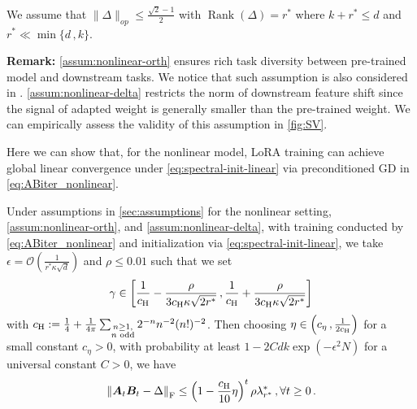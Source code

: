 \begin{assumption}\label{assum:nonlinear-delta}
We assume that $\|\Delta\|_{op}\leq \frac{\sqrt{2}-1}{2}$ with $\operatorname{Rank}(\Delta)=r^*$ where $k+r^*\leq d$ and $r^* \ll \min\{d\,,k\}$.
\end{assumption}

\noindent
{\bf Remark:} 
\cref{assum:nonlinear-orth} ensures rich task diversity between pre-trained model and downstream tasks. We notice that such assumption is also considered in \cite{dayi2024gradientdynamicslowrankfinetuning}.  \cref{assum:nonlinear-delta} restricts the norm of downstream feature shift since the signal of adapted weight is generally smaller than the pre-trained weight. We can empirically assess the validity of this assumption in \cref{fig:SV}.


Here we can show that, for the nonlinear model, LoRA training can achieve global linear convergence under \eqref{eq:spectral-init-linear} via preconditioned GD in \cref{eq:ABiter_nonlinear}.
\begin{theorem}\label{main:LC}
    Under assumptions in \cref{sec:assumptions} for the nonlinear setting, \cref{assum:nonlinear-orth}, and \ref{assum:nonlinear-delta}, with training conducted by \cref{eq:ABiter_nonlinear} and initialization via \eqref{eq:spectral-init-linear},  we take $\epsilon = \mathcal{O}\left(\frac{1}{r^*\kappa\sqrt{d}}\right)$ and $\rho\leq 0.01$ such that
    we set
    \begin{align}\label{main:selection-scale}
        \gamma\in\left[\frac{1}{c_{\rm H}}-\frac{\rho}{3c_{\rm H}\kappa\sqrt{2r^*}}\,,\frac{1}{c_{\rm H}}+\frac{\rho}{3c_{\rm H}\kappa\sqrt{2r^*}}\right]
    \end{align}
    with $c_{\rm H} :=\frac{1}{4} + \frac{1}{4\pi}\sum_{\substack{n\geq 1, \\ n \text{ odd}}} 2^{-n} n^{-2} (n!)^{-2}$.
    Then choosing $\eta \in \left(c_{\eta}\,,\frac{1}{2c_{\rm H}}\right)$ for a small constant $c_{\eta}>0$, with probability at least $1-2Cdk\operatorname{exp}\left(-\epsilon^2 N\right)$ for a universal constant $C>0$, we have
    \begin{align}\label{eq:atbtnon}
            \left\|\bm A_{t}\bm B_{t} - \Delta\right\|_{\rm F}  \leq \left(1-\frac{c_{\rm H}}{10}\eta\right)^t \rho\lambda^*_{r^*}\,, \forall t \geq 0\,.
        \end{align}
\end{theorem}

